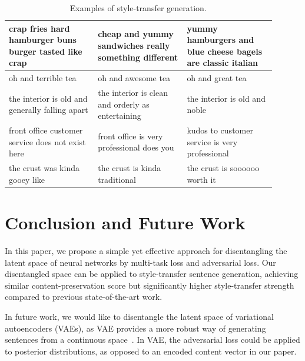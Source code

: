 \documentclass[11pt,a4paper]{article}
\begin{document}
\begin{table}[!ht]
\begin{tabular}{| p{0.3\linewidth} | p{0.3\linewidth} | p{0.3\linewidth} |}
		\hline
		crap fries hard hamburger buns burger tasted like crap & cheap and yummy sandwiches really something different          & yummy hamburgers and blue cheese bagels are classic italian \\
		\hline
		oh and terrible tea                                    & oh and awesome tea                                             & oh and great tea                                            \\
		\hline
		the interior is old and generally falling apart        & the interior is clean and orderly as entertaining              & the interior is old and noble                               \\
		\hline
		front office customer service does not exist here      & front office is very professional does you                     & kudos to customer service is very professional              \\
		\hline
		the crust was kinda gooey like                         & the crust is kinda traditional                                 & the crust is soooooo worth it                               \\
		\hline
	\end{tabular}
	\caption{Examples of style-transfer generation.}
	\label{tab:transfer-samples}
\end{table}

\section{Conclusion and Future Work}
In this paper, we propose a simple yet effective approach for disentangling the latent space of neural networks by multi-task loss and adversarial loss. Our disentangled space can be applied to style-transfer sentence generation, achieving similar content-preservation score but significantly higher style-transfer strength compared to previous state-of-the-art work.

In future work, we would like to disentangle the latent space of variational autoencoders (VAEs), as VAE provides a more robust way of generating sentences from a continuous space~\cite{bowman2016generating}. In VAE, the adversarial loss could be applied to posterior distributions, as opposed to an encoded content vector in our paper.



\end{document}

